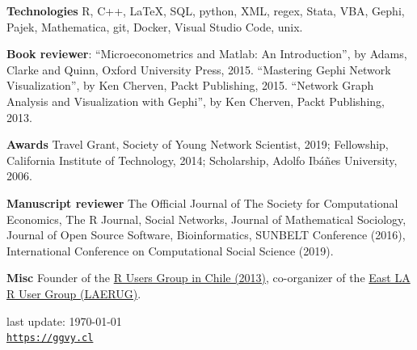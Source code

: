 \documentclass[letterpaper, 11pt]{article}
\def\footerlink{https://ggvy.cl}
\renewenvironment{itemize}{
  \begin{list}{}{
    \setlength{\leftmargin}{0.45cm}
  }
}{
  \end{list}
}
\renewcommand{\textbf}[1]{{\bfseries\color{teal}#1}}
\begin{document}
\begin{itemize}
\item \textbf{Technologies} R, C++, \LaTeX, SQL, python, XML, regex, Stata, VBA, Gephi, Pajek, Mathematica, git, Docker, Visual Studio Code, unix.
\item \textbf{Book reviewer}: ``Microeconometrics and Matlab: An Introduction'', by Adams, Clarke and Quinn, Oxford University Press, 2015. ``Mastering Gephi Network Visualization'', by Ken Cherven, Packt Publishing, 2015. ``Network Graph Analysis and Visualization with Gephi'', by Ken Cherven, Packt Publishing, 2013.
\item \textbf{Awards} Travel Grant, Society of Young Network Scientist, 2019; Fellowship, California Institute of Technology, 2014; Scholarship, Adolfo Ib\'a\~nes University, 2006.
\item \textbf{Manuscript reviewer} The Official Journal of The Society for Computational Economics, The R Journal, Social Networks, Journal of Mathematical Sociology, Journal of Open Source Software, Bioinformatics, SUNBELT Conference (2016), International Conference on Computational Social Science (2019).
\item \textbf{Misc} Founder of the \href{https://www.meetup.com/useRchile/}{R Users Group in Chile (2013)}, co-organizer of the \href{https://socalr.org}{East LA R User Group (LAERUG)}.
\end{itemize}

\bigskip

\begin{center}
 \begin{footnotesize}
   last update: \today \\
   \href{\footerlink}{\texttt{\footerlink}}
 \end{footnotesize}
\end{center}
\end{document}
